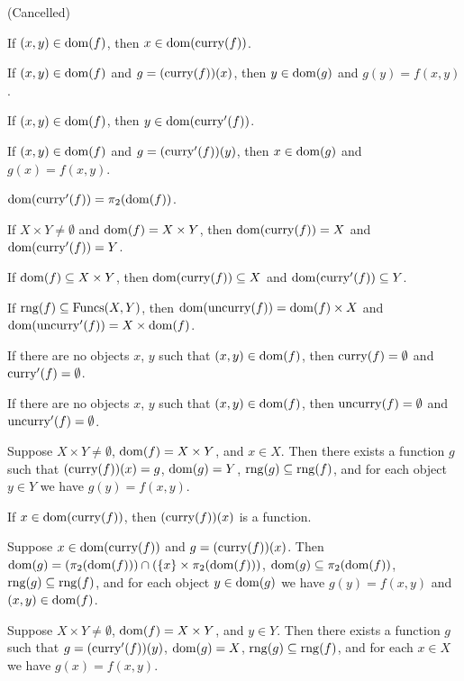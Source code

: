 \documentclass{article}
\begin{document}
\begin{thm}
\item\label{funct5:18} (Cancelled)
\item\label{funct5:19} If $(x,y)\in\operatorname{dom}(f)$, then $x\in\operatorname{dom}(\operatorname{curry}(f))$.
\item\label{funct5:20} If $(x,y)\in\operatorname{dom}(f)$
  and $g=(\operatorname{curry}(f))(x)$, then $y\in\operatorname{dom}(g)$ and $g(y)=f(x,y)$.
\item\label{funct5:21} If $(x,y)\in\operatorname{dom}(f)$, then $y\in\operatorname{dom}(\operatorname{curry}'(f))$.
\item\label{funct5:22} If $(x,y)\in\operatorname{dom}(f)$
  and $g=(\operatorname{curry}'(f))(y)$, then $x\in\operatorname{dom}(g)$ and $g(x)=f(x,y)$.
\item\label{funct5:23} $\operatorname{dom}(\operatorname{curry}'(f))=\pi_{2}(\operatorname{dom}(f))$.
\item\label{funct5:24} If $X\times Y\neq\emptyset$ and $\operatorname{dom}(f)=X\times Y$,
  then $\operatorname{dom}(\operatorname{curry}(f))=X$ and $\operatorname{dom}(\operatorname{curry}'(f))=Y$.
\item\label{funct5:25} If $\operatorname{dom}(f)\subseteq X\times Y$, then
  $\operatorname{dom}(\operatorname{curry}(f))\subseteq X$ and $\operatorname{dom}(\operatorname{curry}'(f))\subseteq Y$.
\item\label{funct5:26} If $\operatorname{rng}(f)\subseteq\operatorname{Funcs}(X,Y)$, then
  $\operatorname{dom}(\operatorname{uncurry}(f))=\operatorname{dom}(f)\times X$ and $\operatorname{dom}(\operatorname{uncurry}'(f))=X\times\operatorname{dom}(f)$.
\item\label{funct5:27} If there are no objects $x$, $y$ such that
  $(x,y)\in\operatorname{dom}(f)$, then $\operatorname{curry}(f)=\emptyset$ and $\operatorname{curry}'(f)=\emptyset$.
\item\label{funct5:28} If there are no objects $x$, $y$ such that
  $(x,y)\in\operatorname{dom}(f)$, then $\operatorname{uncurry}(f)=\emptyset$ and $\operatorname{uncurry}'(f)=\emptyset$.
\item\label{funct5:29} Suppose $X\times Y\neq\emptyset$,
  $\operatorname{dom}(f)=X\times Y$, and $x\in X$.
  Then there exists a function $g$ such that $(\operatorname{curry}(f))(x)=g$,
  $\operatorname{dom}(g)=Y$, $\operatorname{rng}(g)\subseteq\operatorname{rng}(f)$, and for each object $y\in Y$ we
  have $g(y)=f(x,y)$.
\item\label{funct5:30} If $x\in\operatorname{dom}(\operatorname{curry}(f))$, then $(\operatorname{curry}(f))(x)$
  is a function.
\item\label{funct5:31} Suppose $x\in\operatorname{dom}(\operatorname{curry}(f))$ and $g=(\operatorname{curry}(f))(x)$.
  Then $\operatorname{dom}(g)=(\pi_{2}(\operatorname{dom}(f)))\cap(\{x\}\times\pi_{2}(\operatorname{dom}(f)))$,
  $\operatorname{dom}(g)\subseteq\pi_{2}(\operatorname{dom}(f))$, $\operatorname{rng}(g)\subseteq\operatorname{rng}(f)$,
  and for each object $y\in\operatorname{dom}(g)$ we have $g(y)=f(x,y)$ and $(x,y)\in\operatorname{dom}(f)$.
\item\label{funct5:32} Suppose $X\times Y\neq\emptyset$,
  $\operatorname{dom}(f)=X\times Y$, and $y\in Y$.
  Then there exists a function $g$ such that $g=(\operatorname{curry}'(f))(y)$,
  $\operatorname{dom}(g)=X$, $\operatorname{rng}(g)\subseteq\operatorname{rng}(f)$, and for each $x\in X$ we have $g(x)=f(x,y)$.

\end{thm}
\end{document}
